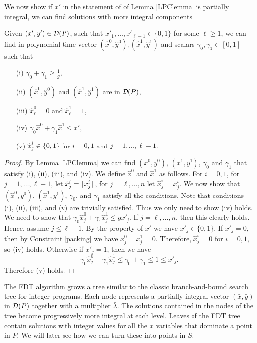 \documentclass[runningheads]{llncs}
\begin{document}
We now show if $x'$ in the statement of of Lemma \ref{LPClemma} is partially integral, we can find solutions with more integral components.
\begin{lemma}\label{round-up}
	Given $(x',y')\in \operatorname{\mathcal{D}}(P)$, such that $x'_1,\ldots,x'_{\ell-1}\in \{0,1\}$ for some $\ell\geq 1$, we can find in polynomial time vector $(\hat{x}^0,\hat{y}^0),(\hat{x}^1,\hat{y}^1)$ and scalars $\gamma_0,\gamma_1 \in [0,1]$ such that
	\begin{itemize}
		\item[(i)] $\gamma_0 + \gamma_1  \geq\frac{ 1}{g}$,
		\item[(ii)] $(\hat{x}^0,\hat{y}^0)$ and $(\hat{x}^1,\hat{y}^1)$ are in  $\operatorname{\mathcal{D}}( P)$, 
		\item[(iii)] $\hat{x}^0_\ell=0$ and $\hat{x}^1_\ell=1$,
		\item[(iv)] $ \gamma_0\hat{x}^0 +\gamma_1 \hat{x}^1 \leq
		x'$,
		\item[(v)] $\hat{x}^i_j\in \{0,1\}$ for $i=0,1$ and $j=1,\ldots,\ell-1$.
	\end{itemize}
\end{lemma} 
\begin{proof}
	By Lemma \ref{LPClemma} we can find $(\bar{x}^0,\bar{y}^0)$, $(\bar{x}^1,\bar{y}^1)$, $\gamma_0$ and $\gamma_1$ that satisfy (i), (ii), (iii), and (iv). We define $\hat{x}^0$ and $\hat{x}^1$ as follows. For $i=0,1$, for $j=1,\ldots,\ell-1$, let $\hat{x}^i_j= \lceil\bar{x}^i_j\rceil$, for $j=\ell,\ldots,n$ let $\hat{x}^i_j = \bar{x}^i_j$. We now show that $(\hat{x}^0,\bar{y}^0)$, $(\hat{x}^1,\bar{y}^1)$, $\gamma_0$, and $\gamma_1$ satisfy all the conditions. Note that conditions (i), (ii), (iii), and (v) are trivially satisfied. Thus we only need to show (iv) holds. We need to show that $\gamma_0 \hat{x}^0_j+\gamma_1\hat{x}^1_j\leq gx'_j$. If $j=\ell,\ldots,n$, then this clearly holds. Hence, assume $j\leq \ell-1$. By the property of $x'$ we have $x'_j\in \{0,1\}$. If $x'_j= 0$, then by Constraint \ref{packing} we have $\bar{x}^0_j = \bar{x}^1_j=0$. Therefore, $\hat{x}^i_j=0$ for $i=0,1$, so (iv) holds. Otherwise if $x'_j = 1$, then we have
	\begin{equation*}\gamma_0\hat{x}^0_j+\gamma_1\hat{x}^1_j\leq \gamma_0+\gamma_1\leq 1\leq x'_j.\end{equation*}
	Therefore (v) holds.
\end{proof}
The FDT algorithm grows a tree similar to the classic branch-and-bound search tree for integer programs. Each node represents a partially integral vector $(\bar{x},\bar{y})$ in $\operatorname{\mathcal{D}}(P)$ together with a multiplier $\bar{\lambda}$. The solutions contained in the nodes of the tree become progressively more integral at each level. Leaves of the FDT tree contain solutions with integer values for all the $x$ variables that dominate a point in $P$. We will later see how we can turn these into points in $S$. 
\end{document}
